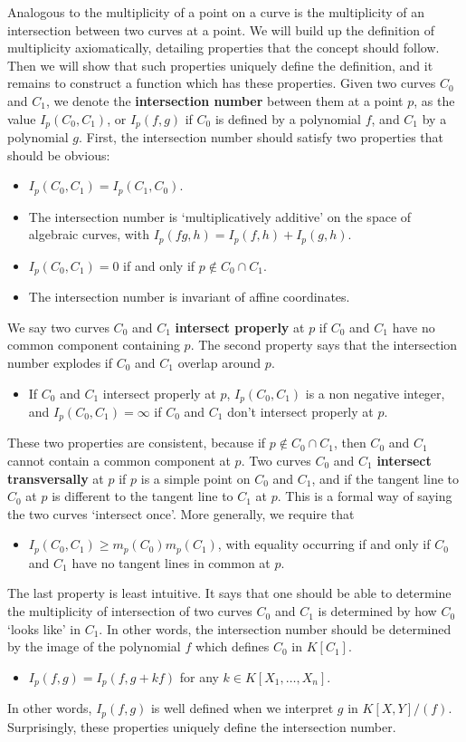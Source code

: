 Analogous to the multiplicity of a point on a curve is the multiplicity of an intersection between two curves at a point. We will build up the definition of multiplicity axiomatically, detailing properties that the concept should follow. Then we will show that such properties uniquely define the definition, and it remains to construct a function which has these properties. Given two curves $C_0$ and $C_1$, we denote the {\bf intersection number} between them at a point $p$, as the value $I_p(C_0,C_1)$, or $I_p(f,g)$ if $C_0$ is defined by a polynomial $f$, and $C_1$ by a polynomial $g$. First, the intersection number should satisfy two properties that should be obvious:
%
\begin{itemize}
    \item $I_p(C_0,C_1) = I_p(C_1,C_0)$.
    \item The intersection number is `multiplicatively additive' on the space of algebraic curves, with $I_p(fg,h) = I_p(f,h) + I_p(g,h)$.
    \item $I_p(C_0,C_1) = 0$ if and only if $p \not \in C_0 \cap C_1$.
    \item The intersection number is invariant of affine coordinates.
\end{itemize}
%
We say two curves $C_0$ and $C_1$ {\bf intersect properly} at $p$ if $C_0$ and $C_1$ have no common component containing $p$. The second property says that the intersection number explodes if $C_0$ and $C_1$ overlap around $p$.
%
\begin{itemize}
    \item If $C_0$ and $C_1$ intersect properly at $p$, $I_p(C_0,C_1)$ is a non negative integer, and $I_p(C_0,C_1) = \infty$ if $C_0$ and $C_1$ don't intersect properly at $p$.
\end{itemize}
%
These two properties are consistent, because if $p \not \in C_0 \cap C_1$, then $C_0$ and $C_1$ cannot contain a common component at $p$. Two curves $C_0$ and $C_1$ {\bf intersect transversally} at $p$ if $p$ is a simple point on $C_0$ and $C_1$, and if the tangent line to $C_0$ at $p$ is different to the tangent line to $C_1$ at $p$. This is a formal way of saying the two curves `intersect once'. More generally, we require that
%
\begin{itemize}
    \item $I_p(C_0,C_1) \geq m_p(C_0) m_p(C_1)$, with equality occurring if and only if $C_0$ and $C_1$ have no tangent lines in common at $p$.
\end{itemize}
%
The last property is least intuitive. It says that one should be able to determine the multiplicity of intersection of two curves $C_0$ and $C_1$ is determined by how $C_0$ `looks like' in $C_1$. In other words, the intersection number should be determined by the image of the polynomial $f$ which defines $C_0$ in $K[C_1]$.
%
\begin{itemize}
    \item $I_p(f,g) = I_p(f,g + kf)$ for any $k \in K[X_1, \dots, X_n]$.
\end{itemize}
%
In other words, $I_p(f,g)$ is well defined when we interpret $g$ in $K[X,Y]/(f)$. Surprisingly, these properties uniquely define the intersection number.

